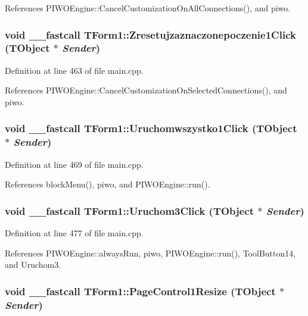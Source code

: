 References PIWOEngine::CancelCustomizationOnAllConnections(), and piwo.\hypertarget{classTForm1_6f6d2f51dc3a2e41541c4df797536486}{
\subsubsection[Zresetujzaznaczonepoczenie1Click]{\setlength{\rightskip}{0pt plus 5cm}void \_\-\_\-fastcall TForm1::Zresetujzaznaczonepoczenie1Click (TObject $\ast$ {\em Sender})}}
\label{classTForm1_6f6d2f51dc3a2e41541c4df797536486}




Definition at line 463 of file main.cpp.

References PIWOEngine::CancelCustomizationOnSelectedConnections(), and piwo.\hypertarget{classTForm1_979be199e4088eb73e1a199eb11531e0}{
\subsubsection[Uruchomwszystko1Click]{\setlength{\rightskip}{0pt plus 5cm}void \_\-\_\-fastcall TForm1::Uruchomwszystko1Click (TObject $\ast$ {\em Sender})}}
\label{classTForm1_979be199e4088eb73e1a199eb11531e0}




Definition at line 469 of file main.cpp.

References blockMenu(), piwo, and PIWOEngine::run().\hypertarget{classTForm1_12f0a6355c0fe7748f97378e8d83d0e2}{
\subsubsection[Uruchom3Click]{\setlength{\rightskip}{0pt plus 5cm}void \_\-\_\-fastcall TForm1::Uruchom3Click (TObject $\ast$ {\em Sender})}}
\label{classTForm1_12f0a6355c0fe7748f97378e8d83d0e2}




Definition at line 477 of file main.cpp.

References PIWOEngine::alwaysRun, piwo, PIWOEngine::run(), ToolButton14, and Uruchom3.\hypertarget{classTForm1_327201e8ba2ffe5f8a866306f4ab602d}{
\subsubsection[PageControl1Resize]{\setlength{\rightskip}{0pt plus 5cm}void \_\-\_\-fastcall TForm1::PageControl1Resize (TObject $\ast$ {\em Sender})}}
\label{classTForm1_327201e8ba2ffe5f8a866306f4ab602d}




